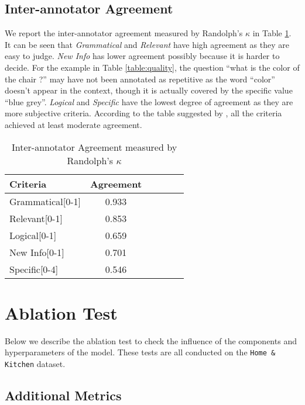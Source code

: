 \subsection{Inter-annotator Agreement}
We report the inter-annotator agreement measured by Randolph's $\kappa$ \citep{randolph2005free} in Table \ref{tab:inter-annotator}. It can be seen that \textit{Grammatical} and \textit{Relevant} have high agreement as they are easy to judge. \textit{New Info} has lower agreement possibly because it is harder to decide. For the example in Table \ref{table:quality}, the question ``what is the color of the chair ?'' may have not been annotated as repetitive as the word ``color'' doesn't appear in the context, though it is actually covered by the specific value ``blue grey''. \textit{Logical} and \textit{Specific} have the lowest degree of agreement as they are more subjective criteria. According to the table suggested by \citet{landis1977measurement}, all the criteria achieved at least moderate agreement.


\begin{table}[htbp]
  \centering
  \begin{tabular}{l|ccccc}
  \hline
  Criteria & Agreement \\
  \hline
  Grammatical\tiny{[0-1]}  &  0.933 \\
  Relevant\tiny{[0-1]} &  0.853 \\
  Logical\tiny{[0-1]} &  0.659  \\
  New Info\tiny{[0-1]} &  0.701  \\
  Specific\tiny{[0-4]} &  0.546  \\
  \hline
  \end{tabular}
  \caption{\label{tab:inter-annotator} Inter-annotator Agreement measured by Randolph's $\kappa$ \citep{randolph2005free}}
\end{table}

\section{Ablation Test}
\label{sec:ablation}

Below we describe the ablation test to check the influence of the components and hyperparameters of the model. These tests are all conducted on the \texttt{Home \& Kitchen} dataset.

\subsection{Additional Metrics}


